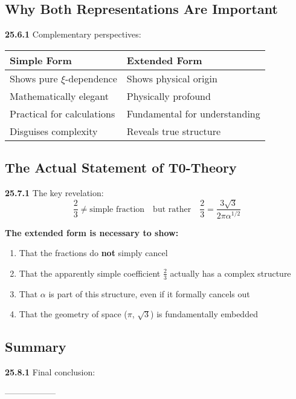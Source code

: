 \documentclass[12pt,a4paper]{article}
\begin{document}
\subsection{Why Both Representations Are Important}

\noindent \textbf{25.6.1} Complementary perspectives:

\begin{tabular}{p{}p{}}
	\textbf{Simple Form} & \textbf{Extended Form} \\
	\hline
	Shows pure $\xi$-dependence & Shows physical origin \\
	Mathematically elegant & Physically profound \\
	Practical for calculations & Fundamental for understanding \\
	Disguises complexity & Reveals true structure \\
\end{tabular}

\subsection{The Actual Statement of T0-Theory}

\noindent \textbf{25.7.1} The key revelation:
\[
\boxed{
	\frac{2}{3} \neq \text{simple fraction} \quad \text{but rather} \quad \frac{2}{3} = \frac{3\sqrt{3}}{2\pi\alpha^{1/2}}
}
\]

\begin{tcolorbox}[colback=green!5!white,colframe=green!75!black]
	\textbf{The extended form is necessary to show:}
	\begin{enumerate}
		\item That the fractions do \textbf{not} simply cancel
		\item That the apparently simple coefficient $\frac{2}{3}$ actually has a complex structure
		\item That $\alpha$ is part of this structure, even if it formally cancels out
		\item That the geometry of space ($\pi$, $\sqrt{3}$) is fundamentally embedded
	\end{enumerate}
\end{tcolorbox}

\subsection{Summary}

\noindent \textbf{25.8.1} Final conclusion:
\begin{center}
\end{center}
------------------
\end{document}
